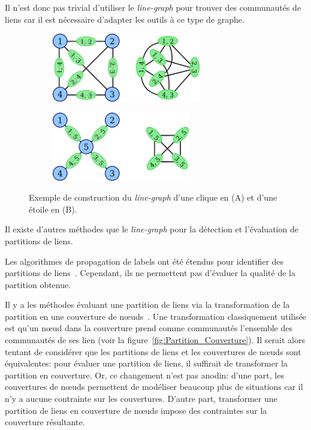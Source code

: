 Il n'est donc pas trivial d'utiliser le \emph{line-graph} pour trouver des communautés de liens car il est nécessaire d'adapter les outils à ce type de graphe.
\begin{figure}
\centering

	\begin{subfigure}{0.4\textwidth}
		\includegraphics[height=3cm]{img/ExpectedNodes/Example/transfo_clique}
		\caption{}
		\label{fig:ex_lineG_clique}	
	\end{subfigure}\hspace*{0.1\textwidth}
	\begin{subfigure}{0.4\textwidth}
		\includegraphics[height=3cm]{img/ExpectedNodes/Example/transfo_etoile}
		\caption{}
		\label{fig:ex_lineG_etoile}	
	\end{subfigure}
	

	\caption{Exemple de construction du \emph{line-graph} d'une clique en (A) et d'une étoile en (B).}
	\label{fig:fail_construction_lineG}
\end{figure}




Il existe d'autres méthodes que le \emph{line-graph} pour la détection et l'évaluation de partitions de liens.

Les algorithmes de propagation de labels ont été étendus pour identifier des partitions de liens~\cite{Yu2013}.
Cependant, ils ne permettent pas d'évaluer la qualité de la partition obtenue.

Il y a les méthodes évaluant une partition de liens via la transformation de la partition en une couverture de n\oe{}uds~\cite{Huang2013,Lim2014,Wu2010a}.
Une transformation classiquement utilisée est qu'un n\oe{}ud dans la couverture prend comme communautés l'ensemble des communautés de ses lien (voir la figure~\ref{fig:Partition_Couverture}).
Il serait alors tentant de considérer que les partitions de liens et les couvertures de n\oe{}uds sont équivalentes: pour évaluer une partition de liens, il suffirait de transformer la partition en couverture.
Or, ce changement n'est pas anodin:
d'une part, les couvertures de n\oe{}uds permettent de modéliser beaucoup plus de situations car il n'y a aucune contrainte sur les couvertures.
D'autre part, transformer une partition de liens en couverture de n\oe{}uds impose des contraintes sur la couverture résultante.

